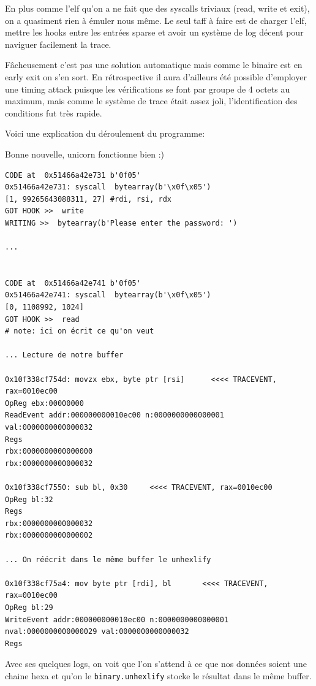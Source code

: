 \documentclass[14pt]{article}
\begin{document}
En plus comme l'elf qu'on a ne fait que des syscalls triviaux (read, write et exit), on a quasiment rien à émuler nous même. Le seul taff à faire est de charger l'elf, mettre les hooks entre les entrées sparse et avoir un système de log décent pour naviguer facilement la trace.

Fâcheusement c'est pas une solution automatique mais comme le binaire est en early exit on s'en sort. En rétrospective il aura d'ailleurs été possible d'employer une timing attack puisque les vérifications se font par groupe de 4 octets au maximum, mais comme le système de trace était assez joli, l'identification des conditions fut très rapide.

Voici une explication du déroulement du programme:

Bonne nouvelle, unicorn fonctionne bien :)
\begin{verbatim}
CODE at  0x51466a42e731 b'0f05'
0x51466a42e731:	syscall	 bytearray(b'\x0f\x05')
[1, 99265643088311, 27] #rdi, rsi, rdx
GOT HOOK >>  write
WRITING >>  bytearray(b'Please enter the password: ')

...


CODE at  0x51466a42e741 b'0f05'
0x51466a42e741:	syscall	 bytearray(b'\x0f\x05')
[0, 1108992, 1024]
GOT HOOK >>  read
# note: ici on écrit ce qu'on veut

... Lecture de notre buffer

0x10f338cf754d: movzx ebx, byte ptr [rsi]      <<<< TRACEVENT, rax=0010ec00
OpReg ebx:00000000 
ReadEvent addr:000000000010ec00 n:0000000000000001 val:0000000000000032 
Regs
rbx:0000000000000000 
rbx:0000000000000032 

0x10f338cf7550: sub bl, 0x30     <<<< TRACEVENT, rax=0010ec00
OpReg bl:32 
Regs
rbx:0000000000000032 
rbx:0000000000000002 

... On réécrit dans le même buffer le unhexlify

0x10f338cf75a4: mov byte ptr [rdi], bl 		 <<<< TRACEVENT, rax=0010ec00
OpReg bl:29 
WriteEvent addr:000000000010ec00 n:0000000000000001 nval:0000000000000029 val:0000000000000032 
Regs
\end{verbatim}

Avec ses quelques logs, on voit que l'on s'attend à ce que nos données soient une chaine hexa et qu'on le \texttt{binary.unhexlify} stocke le résultat dans le même buffer.
\end{document}
